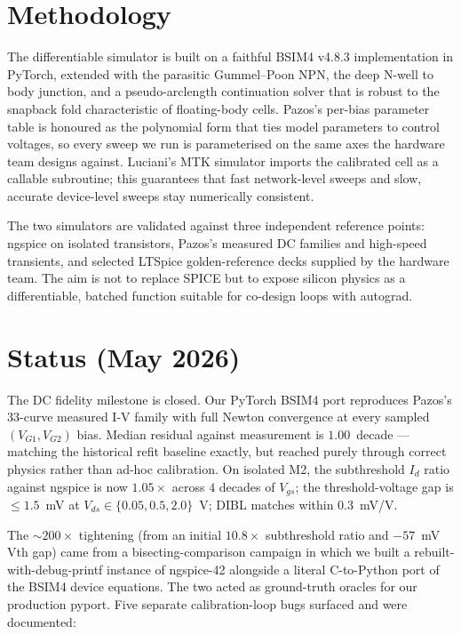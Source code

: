 \documentclass[fontsize=10pt]{article}
\begin{document}
\section{Methodology}
The differentiable simulator is built on a faithful BSIM4 v4.8.3 implementation in
PyTorch, extended with the parasitic Gummel--Poon NPN, the deep N-well to body junction,
and a pseudo-arclength continuation solver that is robust to the snapback fold characteristic
of floating-body cells. Pazos's per-bias parameter table is honoured as the polynomial form
that ties model parameters to control voltages, so every sweep we run is parameterised on
the same axes the hardware team designs against. Luciani's MTK simulator imports the
calibrated cell as a callable subroutine; this guarantees that fast network-level sweeps
and slow, accurate device-level sweeps stay numerically consistent.

The two simulators are validated against three independent reference points: ngspice on
isolated transistors, Pazos's measured DC families and high-speed transients, and selected
LTSpice golden-reference decks supplied by the hardware team. The aim is not to replace
SPICE but to expose silicon physics as a differentiable, batched function suitable for
co-design loops with autograd.

\section{Status (May 2026)}
The DC fidelity milestone is closed. Our PyTorch BSIM4 port reproduces Pazos's 33-curve
measured I-V family with full Newton convergence at every sampled $(V_{G1}, V_{G2})$ bias.
Median residual against measurement is $1.00$~decade — matching the historical refit
baseline exactly, but reached purely through correct physics rather than ad-hoc
calibration. On isolated M2, the subthreshold $I_d$ ratio against ngspice is now
$1.05\times$ across $4$ decades of $V_{gs}$; the threshold-voltage gap is
$\le 1.5$~mV at $V_{ds} \in \{0.05, 0.5, 2.0\}$~V; DIBL matches within $0.3$~mV/V.

The $\sim 200\times$ tightening (from an initial $10.8\times$ subthreshold ratio
and $-57$~mV Vth gap) came from a bisecting-comparison campaign in which we built a
rebuilt-with-debug-printf instance of ngspice-42 alongside a literal C-to-Python
port of the BSIM4 device equations. The two acted as ground-truth oracles for our
production pyport. Five separate calibration-loop bugs surfaced and were
documented:
\end{document}
